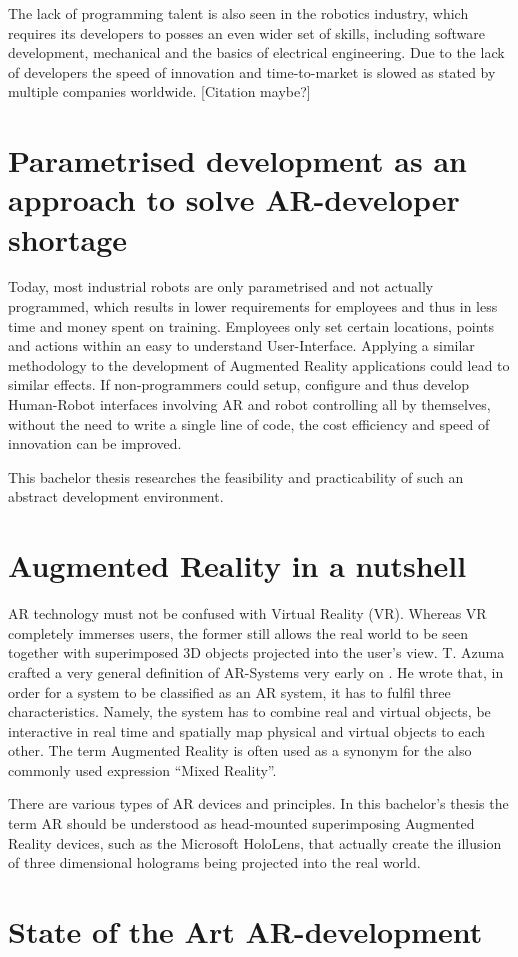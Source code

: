 The lack of programming talent is also seen in the robotics industry, which requires its developers to posses an even wider set of skills, including software development, mechanical and the basics of electrical engineering. Due to the lack of developers the speed of innovation and time-to-market is slowed as stated by multiple companies worldwide. [Citation maybe?]

\section{Parametrised development as an approach to solve AR-developer shortage}
Today, most industrial robots are only parametrised and not actually programmed, which results in lower requirements for employees and thus in less time and money spent on training. Employees only set certain locations, points and actions within an easy to understand User-Interface. Applying a similar methodology to the development of Augmented Reality applications could lead to similar effects. If non-programmers could setup, configure and thus develop Human-Robot interfaces involving AR and robot controlling all by themselves, without the need to write a single line of code, the cost efficiency and speed of innovation can be improved.

This bachelor thesis researches the feasibility and practicability of such an abstract development environment. 

\section{Augmented Reality in a nutshell}

AR technology must not be confused with Virtual Reality (VR). Whereas VR completely immerses
users, the former still allows the real world to be seen together with superimposed 3D objects
projected into the user's view. T. Azuma crafted a very general definition of AR-Systems very early
on \cite{azuma1997survey}. He wrote that, in order for a system to be classified as an AR system, it has to fulfil three
characteristics. Namely, the system has to combine real and virtual objects, be interactive in real time
and spatially map physical and virtual objects to each other. The term Augmented Reality is often
used as a synonym for the also commonly used expression “Mixed Reality”. 

There are various types of AR devices and principles. In this bachelor's thesis the term AR should be understood as head-mounted superimposing Augmented Reality devices, such as the Microsoft HoloLens, that actually create the illusion of three dimensional holograms being projected into the real world.


\section{State of the Art AR-development}



























